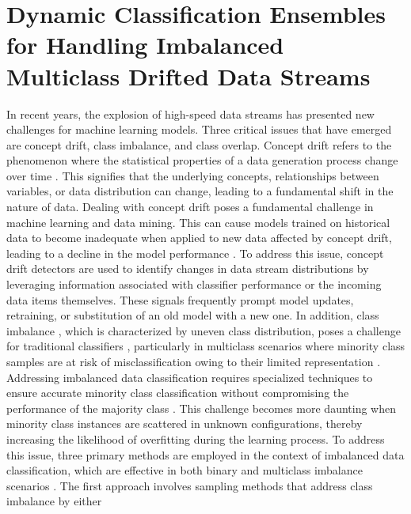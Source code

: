 
\chapter{Dynamic Classification Ensembles for Handling Imbalanced
  Multiclass Drifted Data Streams}
  \label{chapter:4_Imbalanced_Multiclass}
  
  In recent years, the explosion of high-speed data streams has presented new challenges for machine learning models. Three critical
  issues that have emerged are concept drift, class imbalance, and class overlap. Concept drift refers to the phenomenon where the
  statistical properties of a data generation process change over time \cite{yang2021concept}\cite{dong2019multistream}. This signifies that the underlying concepts, relationships
  between variables, or data distribution can change, leading to a fundamental shift in the nature of data. Dealing with concept drift
  poses a fundamental challenge in machine learning and data mining. This can cause models trained on historical data to become
  inadequate when applied to new data affected by concept drift, leading to a decline in the model performance \cite{dong2019multistream}. To address this issue,
  concept drift detectors are used to identify changes in data stream distributions by leveraging information associated with classifier
  performance or the incoming data items themselves. These signals frequently prompt model updates, retraining, or substitution of an
  old model with a new one.
  In addition, class imbalance \cite{dong2019multistream}\cite{pan2009survey}, which is characterized by uneven class distribution, poses a challenge for traditional classifiers
  \cite{zhuang2020comprehensive}, particularly in multiclass scenarios where minority class samples are at risk of misclassification owing to their limited representation \cite{wang2018systematic}. Addressing imbalanced data classification requires specialized techniques to ensure accurate minority class classification without compromising the performance of the majority class \cite{sun2009classification}\cite{charte2015addressing}\cite{charte2015mlsmote}. This challenge becomes more daunting when minority class instances are scattered in unknown configurations, thereby increasing the likelihood of overfitting during the learning process. To
  address this issue, three primary methods are employed in the context of imbalanced data classification, which are effective in both
  binary and multiclass imbalance scenarios \cite{daniels2017addressing}. The first approach involves sampling methods that address class imbalance by either

